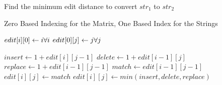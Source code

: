 \documentclass[12pt]{article}
\begin{document}
\begin{algorithm}

  \caption{Find the minimum edit distance to convert $str_1$ to $str_2$}
  
  \begin{algorithmic}[1]
    \Ensure Zero Based Indexing for the Matrix, One Based Index for the Strings
    \Statex
        
        \State $edit[i][0] \gets i \hfill \forall i$ 
        \State $edit[0][j] \gets j \hfill \forall j$ 

                \State $insert \gets 1 + edit[i][j-1]$
                \State $delete \gets 1+ edit[i-1][j]$
                \State $replace \gets 1 + edit[i-1][j-1]$
                \State $match \gets edit[i-1][j-1] $
                    \State $edit[i][j] \gets match$
                \Else 
                    \State $edit[i][j] \gets min(insert, delete, replace) $
                \EndIf
            \EndFor
        \EndFor
        
        \State {}
    \EndFunction
  \end{algorithmic}
  
\end{algorithm}
\end{document}
